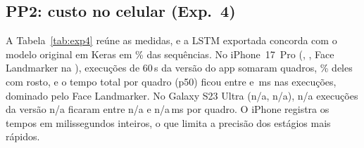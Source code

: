 \documentclass[conference]{IEEEtran}
\providecommand{\CelularSamsungExecucoes}{n/a}\providecommand{\CelularSamsungVersaoApp}{n/a}
\providecommand{\CelularSamsungSistema}{n/a}\providecommand{\CelularSamsungNavegador}{n/a}
\providecommand{\CelularSamsungTotalPcinquentaMin}{n/a}\providecommand{\CelularSamsungTotalPcinquentaMax}{n/a}
\begin{document}
\subsection{PP2: custo no celular (Exp.~4)}
\label{sec:respp2}
A Tabela~\ref{tab:exp4} reúne as medidas, e a LSTM exportada concorda com o modelo original em Keras em \ExpUmLSTMConcordancia\% das sequências. No iPhone~17~Pro (\CelularIPhoneSistema, \CelularIPhoneNavegador, Face Landmarker na \CelularIPhoneDelegate), \CelularIPhoneExecucoes{} execuções de 60\,s da versão \CelularIPhoneVersaoApp{} do app somaram \CelularIPhoneQuadros{} quadros, \CelularIPhoneTaxaRosto\% deles com rosto, e o tempo total por quadro (p50) ficou entre \CelularIPhoneTotalPcinquentaMin{} e \CelularIPhoneTotalPcinquentaMax\,ms nas execuções, dominado pelo Face Landmarker.\ifSamsungMedido{} No Galaxy S23 Ultra (\CelularSamsungSistema, \CelularSamsungNavegador), \CelularSamsungExecucoes{} execuções da versão \CelularSamsungVersaoApp{} ficaram entre \CelularSamsungTotalPcinquentaMin{} e \CelularSamsungTotalPcinquentaMax\,ms por quadro.\fi{} O iPhone registra os tempos em milissegundos inteiros, o que limita a precisão dos estágios mais rápidos.
\end{document}

